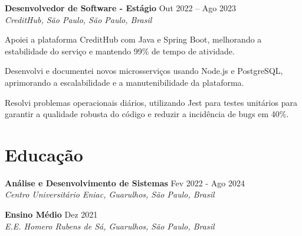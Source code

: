 \documentclass[11pt,letterpaper]{article}
\begin{document}
\textbf{Desenvolvedor de Software - Estágio} \hfill Out 2022 – Ago 2023 \\
\textit{CreditHub, São Paulo, São Paulo, Brasil}
\begin{achievements}
    \item Apoiei a plataforma CreditHub com Java e Spring Boot, melhorando a estabilidade do serviço e mantendo 99\% de tempo de atividade.
    \item Desenvolvi e documentei novos microsserviços usando Node.js e PostgreSQL, aprimorando a escalabilidade e a manutenibilidade da plataforma.
    \item Resolvi problemas operacionais diários, utilizando Jest para testes unitários para garantir a qualidade robusta do código e reduzir a incidência de bugs em 40\%.
\end{achievements}

\section{Educação}
\textbf{Análise e Desenvolvimento de Sistemas} \hfill Fev 2022 - Ago 2024 \\
\textit{Centro Universitário Eniac, Guarulhos, São Paulo, Brasil}

\textbf{Ensino Médio} \hfill Dez 2021 \\
\textit{E.E. Homero Rubens de Sá, Guarulhos, São Paulo, Brasil}
\end{document}
